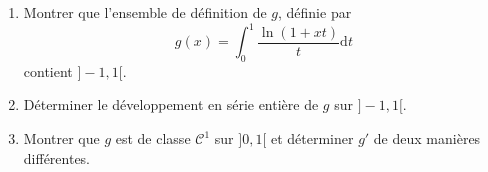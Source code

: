 \documentclass[a4paper,twoside,french,11pt]{VcCours}
\newcommand{\dt}{\text{d}t}
\begin{document}
\begin{Exercice}{} \begin{enumerate}
\item Montrer que l'ensemble de définition de $g$, définie par 
$$ g(x) = \int_{0}^1 \dfrac{\ln(1+xt)}{t} \dt$$
contient $]-1,1[$.
\item Déterminer le développement en série entière de $g$ sur $]-1,1[$.
\item Montrer que $g$ est de classe $\mathcal{C}^1$ sur $]0,1[$ et déterminer $g'$ de deux manières différentes.
\end{enumerate}
\end{Exercice}

\end{document}

